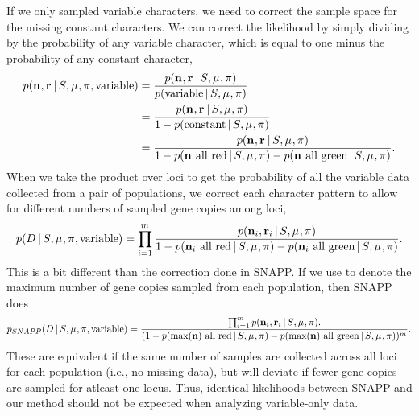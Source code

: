 If we only sampled variable characters, we need to correct the sample space for
the missing constant characters.
We can correct the likelihood by simply dividing by the probability of any
variable character, which is equal to one minus the probability of any constant
character,
\begin{equation}
\begin{split}
    \pr(\leafallelecounts, \leafredallelecounts \given \sptree, \murate, \gfreq, \textrm{variable})
    & =
    \frac{
        \pr(\leafallelecounts, \leafredallelecounts \given \sptree, \murate, \gfreq)
    }{
        \pr(\textrm{variable} \given \sptree, \murate, \gfreq)
    } \\
    & =
    \frac{
        \pr(\leafallelecounts, \leafredallelecounts \given \sptree, \murate, \gfreq)
    }{
        1 - \pr(\textrm{constant} \given \sptree, \murate, \gfreq)
    } \\
    & =
    \frac{
        \pr(\leafallelecounts, \leafredallelecounts \given \sptree, \murate, \gfreq)
    }{
        1 - \pr(\leafallelecounts \textrm{ all red} \given \sptree, \murate, \gfreq)
        - \pr(\leafallelecounts \textrm{ all green} \given \sptree, \murate, \gfreq)
    }.
    \label{eq:variablemarkerlikelihood}
\end{split}
\end{equation}
When we take the product over loci to get the probability of all the variable
data collected from a pair of populations, we correct each character pattern to
allow for different numbers of sampled gene copies among loci,
\begin{equation}
    \pr(\comparisondata \given \sptree, \murate, \gfreq, \textrm{variable})
    =
    \prod_{i=1}^{\nloci}
    \frac{
        \pr(\leafallelecounts[i], \leafredallelecounts[i] \given \sptree, \murate, \gfreq)
    }{
        1 - \pr(\leafallelecounts[i] \textrm{ all red} \given \sptree, \murate, \gfreq)
        - \pr(\leafallelecounts[i] \textrm{ all green} \given \sptree, \murate, \gfreq)
    }.
    \label{eq:variablecomparisonlikelihood}
\end{equation}
This is a bit different than the correction done in SNAPP.
If we use \maxleafallelecounts to denote the maximum number
of gene copies sampled from each population, then SNAPP does
\begin{equation}
    \pr_{\tiny SNAPP}(\comparisondata \given \sptree, \murate, \gfreq, \textrm{variable})
    =
    \frac{
        \prod_{i=1}^{\nloci}
        \pr(\leafallelecounts[i], \leafredallelecounts[i] \given \sptree, \murate, \gfreq).
    }{
        (1 - \pr(\maxleafallelecounts \textrm{ all red} \given \sptree, \murate, \gfreq)
        - \pr(\maxleafallelecounts \textrm{ all green} \given \sptree, \murate, \gfreq))^{\nloci}
    }.
    \label{eq:snappvariablecomparisonlikelihood}
\end{equation}
These are equivalent if the same number of samples are collected across all
loci for each population (i.e., no missing data), but will deviate if fewer
gene copies are sampled for atleast one locus.
Thus, identical likelihoods between SNAPP and our method should not be expected
when analyzing variable-only data.

